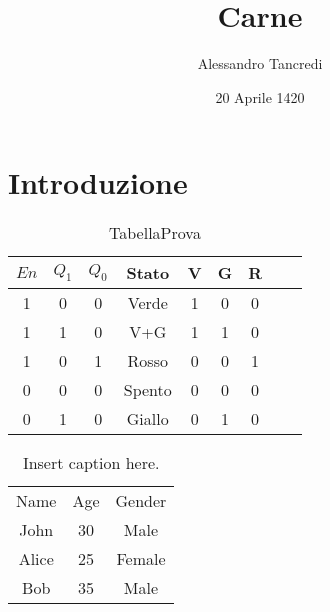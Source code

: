 \documentclass{article}
\author{Alessandro Tancredi}
\title{Carne}
\begin{document}
\date{20 Aprile 1420}
\maketitle

\section{Introduzione}


\begin{table}[!h]
\caption{TabellaProva}
\begin{center}
\label{tab:codifica}
\begin{tabular}{||c|cc|cccc||cc||}
\hline
$En$ & $Q_1$ & $Q_0$ & Stato & V & G & R \\
\hline
1&0     & 0     & Verde & 1 & 0 & 0   \\
1&1     & 0     & V+G   & 1 & 1 & 0    \\
1&0     & 1     & Rosso & 0 & 0 & 1    \\
0 &0     & 0     & Spento & 0 & 0 & 0    \\
0 &1     & 0     & Giallo & 0 & 1 & 0 \\
\hline
\end{tabular}
\end{center}
\end{table}

\begin{table}[htbp]
    \centering
    \begin{tabular}{||c|c|c||}
    \hline
    Name & Age & Gender \\
    John & 30 & Male \\
    Alice & 25 & Female \\
    Bob & 35 & Male \\
    \hline
    \end{tabular}
    \caption{Insert caption here.}
    \label{tab:my_table}
    \end{table}
\end{document}
